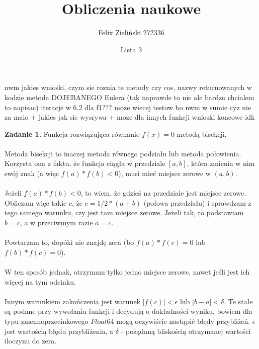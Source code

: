 \documentclass[15pt, a4paper]{article}
\title{Obliczenia naukowe}
\author{Felix Zieliński 272336}
\date{Lista 3}
\begin{document}
\maketitle

nwm jakies wnioski, czym sie roznia te metody czy cos, nazwy returnowanych w kodzie
metoda DOJEBANEGO Eulera (tak naprawde to nie ale bardzo chcialem to napisac)
iteracje w 6.2 dla f1???
moze wiecej testow bo nwm w sumie cyz nie za malo + jakies jak sie wysrywa + moze dla innych funkcji
wnioski koncowe idk

\vspace{0.5cm}

\noindent\hrulefill

\vspace{0.5cm}


\noindent\textbf{Zadanie 1.} Funkcja rozwiązująca równanie \( f(x) = 0 \) metodą bisekcji.\\\\
\noindent Metoda bisekcji to inaczej metoda równego podziału lub metoda połowienia. 
Korzysta ona z faktu, że funkcja ciągła w przedziale \( [a, b] \), która zmienia w nim swój znak (a więc \( f(a) * f(b) < 0 \)), musi mieć miejsce zerowe w \( (a, b) \).\\\\
\noindent Jeżeli \( f(a) * f(b) < 0 \), to wiem, że gdzieś na przedziale jest miejsce zerowe. Obliczam więc takie \(c\), że \( c = 1/2 * (a + b) \) (połowa przedziału) i sprawdzam z tego samego warunku, czy jest tam miejsce zerowe. Jeżeli tak, to podstawiam \( b = c \), a w przeciwmym razie \( a = c \).\\\\
\noindent Powtarzam to, dopóki nie znajdę zera (bo \( f(a) * f(c) = 0 \) lub \(f(b) * f(c) = 0 \)). \\\\
\noindent W ten sposób jednak, otrzymam tylko jedno miejsce zerowe, nawet jeśli jest ich więcej na tym odcinku.\\\\ 
\noindent Innym warunkiem zakończenia jest warunek \(|f(c)| < \epsilon \) lub \(|b - a| < \delta \). Te stałe są podane przy wywołaniu funkcji i decydują o dokładności wyniku, bowiem dla typu zmennoprzecinkowego \(Float64\) mogą oczywiście nastąpić błędy przybliżeń. \( \epsilon \) jest wartością błędu przybliżenia, a \(\delta\) - pożądaną bliskością otrzymanej wartości iloczynu do zera. 

\pagebreak
\end{document}

